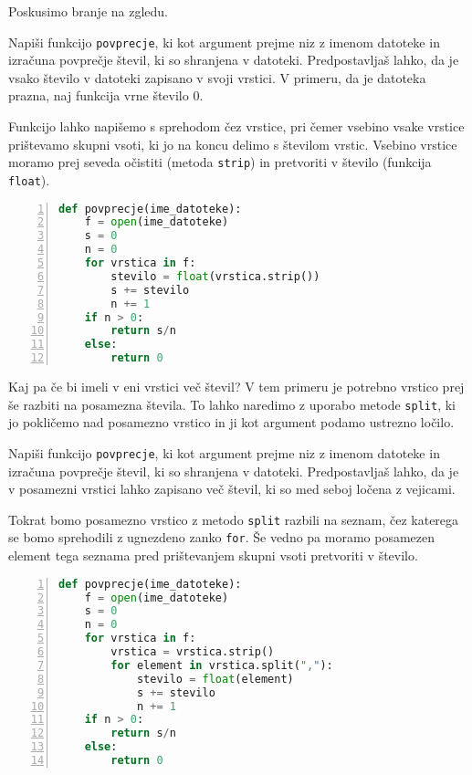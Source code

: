 Poskusimo branje na zgledu.
\begin{zgled}
Napiši funkcijo \texttt{povprecje}, ki kot argument prejme niz z imenom datoteke in izračuna povprečje števil, ki so shranjena v datoteki. Predpostavljaš lahko, da je vsako število v datoteki zapisano v svoji vrstici. V primeru, da je datoteka prazna, naj funkcija vrne število 0.
\end{zgled}
\begin{resitev}
Funkcijo lahko napišemo s sprehodom čez vrstice, pri čemer vsebino vsake vrstice prištevamo skupni vsoti, ki jo na koncu delimo s številom vrstic. Vsebino vrstice moramo prej seveda očistiti (metoda \texttt{strip}) in pretvoriti v število (funkcija \texttt{float}). 
\begin{lstlisting}[language=Python, showstringspaces=false,numbers=left]
def povprecje(ime_datoteke):
    f = open(ime_datoteke)
    s = 0
    n = 0
    for vrstica in f:
        stevilo = float(vrstica.strip())
        s += stevilo
        n += 1
    if n > 0:
        return s/n
    else:
        return 0
\end{lstlisting}
\end{resitev}

Kaj pa če bi imeli v eni vrstici več števil? V tem primeru je potrebno vrstico prej še razbiti na posamezna števila. To lahko naredimo z uporabo metode \texttt{split}, ki jo pokličemo nad posamezno vrstico in ji kot argument podamo ustrezno ločilo.

\begin{zgled}
Napiši funkcijo \texttt{povprecje}, ki kot argument prejme niz z imenom datoteke in izračuna povprečje števil, ki so shranjena v datoteki. Predpostavljaš lahko, da je v posamezni vrstici lahko zapisano več števil, ki so med seboj ločena z vejicami.
\end{zgled}
\begin{resitev}
Tokrat bomo posamezno vrstico z metodo \texttt{split} razbili na seznam, čez katerega se bomo sprehodili z ugnezdeno zanko \texttt{for}. Še vedno pa moramo posamezen element tega seznama pred prištevanjem skupni vsoti pretvoriti v število.
\begin{lstlisting}[language=Python, showstringspaces=false,numbers=left]
def povprecje(ime_datoteke):
    f = open(ime_datoteke)
    s = 0
    n = 0
    for vrstica in f:
        vrstica = vrstica.strip()
        for element in vrstica.split(","):
            stevilo = float(element)
            s += stevilo    
            n += 1
    if n > 0:
        return s/n
    else:
        return 0
\end{lstlisting}
\end{resitev}

